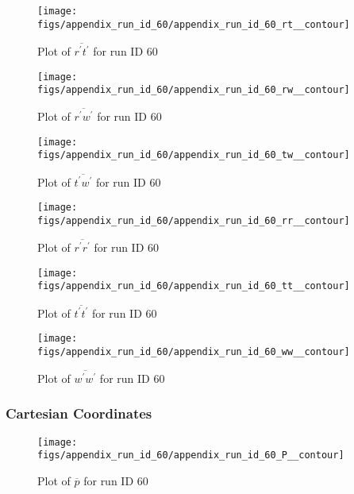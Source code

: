 \begin{figure}[H]
\centering
\texttt{[image: figs/appendix\_run\_id\_60/appendix\_run\_id\_60\_rt\_\_contour]}
\caption{Plot of $\overline{r^\prime t^\prime}$ for run ID 60}
\label{fig:appendix_run_id_60_rt__contour}
\end{figure}


\begin{figure}[H]
\centering
\texttt{[image: figs/appendix\_run\_id\_60/appendix\_run\_id\_60\_rw\_\_contour]}
\caption{Plot of $\overline{r^\prime w^\prime}$ for run ID 60}
\label{fig:appendix_run_id_60_rw__contour}
\end{figure}


\begin{figure}[H]
\centering
\texttt{[image: figs/appendix\_run\_id\_60/appendix\_run\_id\_60\_tw\_\_contour]}
\caption{Plot of $\overline{t^\prime w^\prime}$ for run ID 60}
\label{fig:appendix_run_id_60_tw__contour}
\end{figure}


\begin{figure}[H]
\centering
\texttt{[image: figs/appendix\_run\_id\_60/appendix\_run\_id\_60\_rr\_\_contour]}
\caption{Plot of $\overline{r^\prime r^\prime}$ for run ID 60}
\label{fig:appendix_run_id_60_rr__contour}
\end{figure}


\begin{figure}[H]
\centering
\texttt{[image: figs/appendix\_run\_id\_60/appendix\_run\_id\_60\_tt\_\_contour]}
\caption{Plot of $\overline{t^\prime t^\prime}$ for run ID 60}
\label{fig:appendix_run_id_60_tt__contour}
\end{figure}


\begin{figure}[H]
\centering
\texttt{[image: figs/appendix\_run\_id\_60/appendix\_run\_id\_60\_ww\_\_contour]}
\caption{Plot of $\overline{w^\prime w^\prime}$ for run ID 60}
\label{fig:appendix_run_id_60_ww__contour}
\end{figure}


\subsubsection{Cartesian Coordinates}
\begin{figure}[H]
\centering
\texttt{[image: figs/appendix\_run\_id\_60/appendix\_run\_id\_60\_P\_\_contour]}
\caption{Plot of $\overline{p}$ for run ID 60}
\label{fig:appendix_run_id_60_P__contour}
\end{figure}


